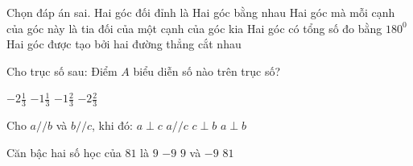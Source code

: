 \documentclass[12pt,a4paper]{article}
\begin{document}
\begin{ex}
Chọn đáp án sai. Hai góc đối đỉnh là
\choice
{Hai góc bằng nhau}
{Hai góc mà mỗi cạnh của góc này là tia đối của một cạnh của góc kia}
{\True Hai góc có tổng số đo bằng $180^0$}
{Hai góc được tạo bởi hai đường thẳng cắt nhau}
\end{ex}

\begin{ex}
Cho trục số sau: Điểm $A$ biểu diễn số nào trên trục số?
\begin{center}
\end{center}
\choice
{$-2\frac{1}{3}$}
{$-1\frac{1}{3}$}
{\True $-1\frac{2}{3}$}
{$-2\frac{2}{3}$}
\end{ex}

\begin{ex}
Cho $a//b$ và $b//c$, khi đó:
\choice
{$a \perp c$}
{\True $a // c$}
{$c \perp b$}
{$a \perp b$}
\end{ex}

\begin{ex}
Căn bậc hai số học của $81$ là
\choice
{\True $9$}
{$-9$}
{$9$ và $-9$}
{$81$}
\end{ex}
\end{document}
